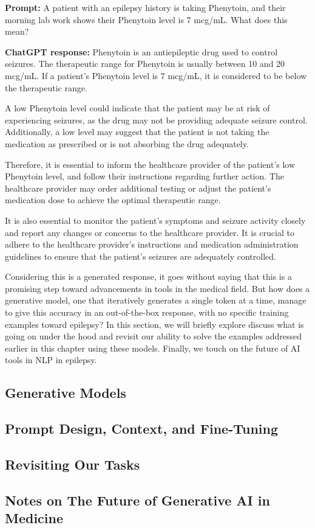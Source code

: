 \begin{displayquote}
  \textbf{Prompt:} A patient with an epilepsy history is taking Phenytoin, and their morning lab work shows their Phenytoin level is 7 mcg/mL. What does this mean?
\end{displayquote}

\begin{displayquote}
  \textbf{ChatGPT response:} Phenytoin is an antiepileptic drug used to control seizures. The therapeutic range for Phenytoin is usually between 10 and 20 mcg/mL. If a patient's Phenytoin level is 7 mcg/mL, it is considered to be below the therapeutic range.

  A low Phenytoin level could indicate that the patient may be at risk of experiencing seizures, as the drug may not be providing adequate seizure control. Additionally, a low level may suggest that the patient is not taking the medication as prescribed or is not absorbing the drug adequately.
  
  Therefore, it is essential to inform the healthcare provider of the patient's low Phenytoin level, and follow their instructions regarding further action. The healthcare provider may order additional testing or adjust the patient's medication dose to achieve the optimal therapeutic range.
  
  It is also essential to monitor the patient's symptoms and seizure activity closely and report any changes or concerns to the healthcare provider. It is crucial to adhere to the healthcare provider's instructions and medication administration guidelines to ensure that the patient's seizures are adequately controlled.
\end{displayquote}

Considering this is a generated response, it goes without saying that this is a promising step toward advancements in tools
in the medical field. But how does a generative model, one that iteratively generates a single token at a time, manage to give
this accuracy in an out-of-the-box response, with no specific training examples toward epilepsy? In this section, we will briefly explore
discuss what is going on under the hood and revisit our ability to solve the examples addressed earlier in this chapter using these
models. Finally, we touch on the future of AI tools in NLP in epilepsy.

\subsection{Generative Models}

\subsection{Prompt Design, Context, and Fine-Tuning}

\subsection{Revisiting Our Tasks}

\subsection{Notes on The Future of Generative AI in Medicine}
